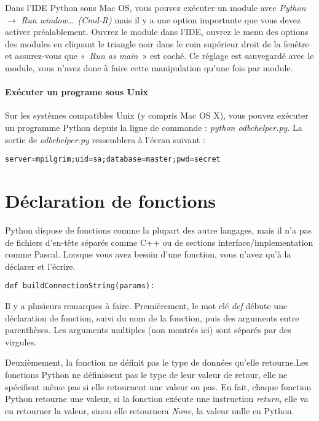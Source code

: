 Dans l'IDE Python sous Mac OS, vous pouvez exécuter un module avec \emph{Python}$\rightarrow$ \emph{Run window…~(Cmd-R)} mais il y a une option importante que vous devez activer préalablement. Ouvrez le module dans l'IDE, ouvrez le menu des options des modules en cliquant le triangle noir dans le coin supérieur droit de la fenêtre et assurez-vous que «~\emph{Run as main}~» est coché. Ce réglage est sauvegardé avec le module, vous n'avez donc à faire cette manipulation qu'une fois par module.

\paragraph*{Exécuter un programe sous Unix}

Sur les systèmes compatibles Unix (y compris Mac OS X), vous pouvez exécuter un programme Python depuis la ligne de commande : \emph{python odbchelper.py}. La sortie de \emph{odbchelper.py} ressemblera à l'écran suivant :

\begin{lstlisting}
server=mpilgrim;uid=sa;database=master;pwd=secret
\end{lstlisting}

\section{Déclaration de fonctions}

Python dispose de fonctions comme la plupart des autre langages, mais il n'a pas de fichiers d'en-tête séparés comme C++ ou de sections interface/implementation comme Pascal. Lorsque vous avez besoin d'une fonction, vous n'avez qu'à la déclarer et l'écrire.

\begin{lstlisting}
def buildConnectionString(params):
\end{lstlisting}

Il y a plusieurs remarques à faire. Premièrement, le mot clé \emph{def} débute une déclaration de fonction, suivi du nom de la fonction, puis des arguments entre parenthèses. Les arguments multiples (non montrés ici) sont séparés par des virgules.

Deuxièmement, la fonction ne définit pas le type de données qu'elle retourne.Les fonctions Python ne définissent pas le type de leur valeur de retour, elle ne spécifient même pas si elle retournent une valeur ou pas. En fait, chaque fonction Python retourne une valeur, si la fonction exécute une instruction \emph{return}, elle va en retourner la valeur, sinon elle retournera \emph{None}, la valeur nulle en Python.

